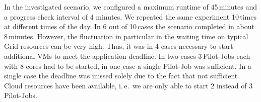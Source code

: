 \documentclass[conference,final]{IEEEtran}
\newcommand{\up}{\vspace*{-1em}}
\newcommand{\alnote}[1]{ {\textcolor{blue} { ***AL: #1 }}}
\newcommand{\jhanote}[1]{ {\textcolor{red} { ***SJ: #1 }}}
\newcommand{\alnote}[1]{}
\newcommand{\jhanote}[1]{}
\begin{document}
In the investigated scenario, we configured a maximum runtime of
45\,minutes and a progress check interval of 4 minutes. We repeated
the same experiment 10\,times at different times of the day. In 6 out
of 10\,cases the scenario completed in about 8\,minutes. However, the
fluctuation in particular in the waiting time on typical Grid
resources can be very high. Thus, it was in 4 cases necessary to
start additional VMs to meet the application deadline. 
In two cases 3\,Pilot-Jobs each with 8 cores had to be
started, in one case a single Pilot-Job was sufficient. 
In a single case the deadline was missed
solely due to the fact that not sufficient Cloud resources have been
available, i.\,e.\ we are only able to start 2 instead of 3 Pilot-Jobs. 





\end{document}
